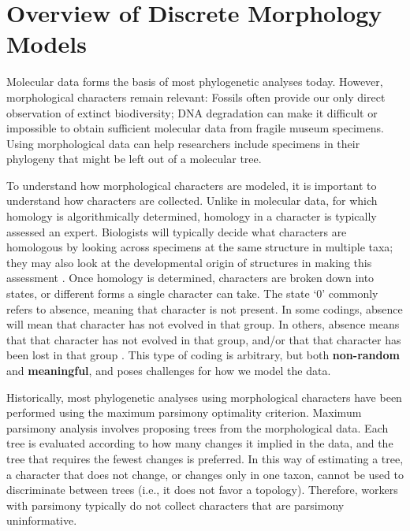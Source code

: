 \section{Overview of Discrete Morphology Models} \label{sec:dm_overview}
\begin{figure}[h!]
\label{fig:module-gm}
\end{figure}
Molecular data forms the basis of most phylogenetic analyses today. 
However, morphological characters remain relevant: Fossils often provide our only direct observation of extinct biodiversity; DNA degradation can make it difficult or impossible to obtain sufficient molecular data from fragile museum specimens. 
Using morphological data can help researchers include specimens in their phylogeny that might be left out of a molecular tree. \par
To understand how morphological characters are modeled, it is important to understand how characters are collected.
Unlike in molecular data, for which homology is algorithmically determined, homology in a character is typically assessed an expert. 
Biologists will typically decide what characters are homologous by looking across specimens at the same structure in multiple taxa; they may also look at the developmental origin of structures in making this assessment \citep{Phillips06}.
Once homology is determined, characters are broken down into states, or different forms a single character can take.
The state `0' commonly refers to absence, meaning that character is not present.
In some codings, absence will mean that character has not evolved in that group.
In others, absence means that that character has not evolved in that group, and/or that that character has been lost in that group \citep{freudenstein05}. 
This type of coding is arbitrary, but both \textbf{non-random} and \textbf{meaningful}, and poses challenges for how we model the data. 
\par

Historically, most phylogenetic analyses using morphological characters have been performed using the maximum parsimony optimality criterion. 
Maximum parsimony analysis involves proposing trees from the morphological data.
Each tree is evaluated according to how many changes it implied in the data, and the tree that requires the fewest changes is preferred.
In this way of estimating a tree, a character that does not change, or changes only in one taxon, cannot be used to discriminate between trees (i.e., it does not favor a topology).
Therefore, workers with parsimony typically do not collect characters that are parsimony uninformative.
\par


